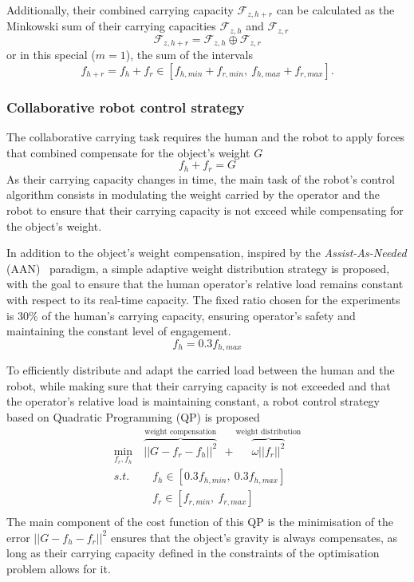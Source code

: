 Additionally, their combined carrying capacity $\mathcal{F}_{z,h+r}$ can be calculated as the Minkowski sum of their carrying capacities $\mathcal{F}_{z,h}$ and $\mathcal{F}_{z,r}$ 
$$\mathcal{F}_{z,h+r} = \mathcal{F}_{z,h}\oplus \mathcal{F}_{z,r}$$
or in this special ($m=1$), the sum of the intervals 
$$f_{h+r} = f_{h}+f_{r} \in  [f_{h,min} + f_{r,min}, ~f_{h,max} + f_{r,max}].$$

\subsubsection{Collaborative robot control strategy}
\label{sec:collab_robot_control_human_robot}

The collaborative carrying task requires the human and the robot to apply forces that combined compensate for the object's weight $G$ 
$$f_{h} + f_{r} = G$$
As their carrying capacity changes in time, the main task of the robot's control algorithm consists in modulating the weight carried by the operator and the robot to ensure that their carrying capacity is not exceed while compensating for the object's weight.

In addition to the object's weight compensation, inspired by the \textit{Assist-As-Needed} (AAN)~\cite{carmichael2013admittance} paradigm, a simple adaptive weight distribution strategy is proposed, with the goal to ensure that the human operator's relative load remains constant with respect to its real-time capacity. The fixed ratio chosen for the experiments is 30\% of the human's carrying capacity, ensuring operator's safety and maintaining the constant level of engagement.
$$
f_h = 0.3 f_{h,max}
$$

To efficiently distribute and adapt the carried load between the human and the robot, while making sure that their carrying capacity is not exceeded and that the operator's relative load is maintaining constant, a robot control strategy based on Quadratic Programming (QP) is proposed
\begin{equation}
\begin{split}
    \min_{f_r,f_h} &~\overbrace{||G - f_r -f_h||^2}^{\text{weight compensation}} ~~+ \overbrace{\omega||f_r||^2}^{\text{weight distribution}}\\
    s.t.& \quad f_h \in[0.3f_{h,min}, ~0.3f_{h,max}]\\
    & \quad f_r \in[f_{r,min}, ~f_{r,max}]\\
\end{split}
\label{eq:qp_human_robot}
\end{equation}
The main component of the cost function of this QP is the minimisation of the error $||G - f_{h} -f_{r}||^2$ ensures that the object's gravity is always compensates, as long as their carrying capacity defined in the constraints of the optimisation problem allows for it. 

